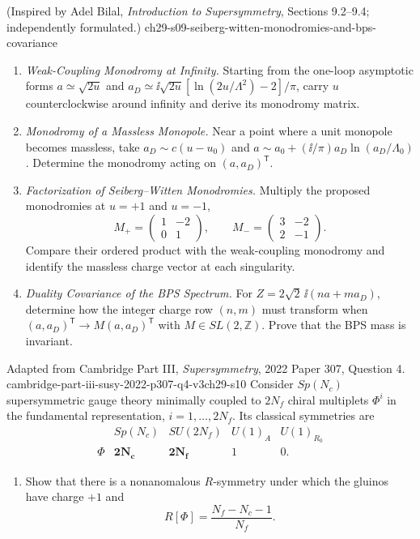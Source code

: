 \begin{enumerate}
    {(Inspired by Adel Bilal, \emph{Introduction to Supersymmetry}, Sections 9.2--9.4; independently formulated.)}
    {ch29-s09-seiberg-witten-monodromies-and-bps-covariance}
  \begin{enumerate}
    \item \emph{Weak-Coupling Monodromy at Infinity.}
    Starting from the one-loop asymptotic forms
      \(a\simeq\sqrt{2u}\) and
      \(a_D\simeq \ii\sqrt{2u}[\ln(2u/\Lambda^2)-2]/\pi\), carry \(u\)
      counterclockwise around infinity and derive its monodromy matrix.
    \item \emph{Monodromy of a Massless Monopole.}
    Near a point where a unit monopole becomes massless, take
      \(a_D\sim c(u-u_0)\) and
      \(a\sim a_0+(\ii/\pi)a_D\ln(a_D/\Lambda_0)\).
      Determine the monodromy acting on \((a,a_D)^{\mathsf T}\).
    \item \emph{Factorization of Seiberg--Witten Monodromies.}
    Multiply the proposed monodromies at \(u=+1\) and \(u=-1\),
      \[
        M_+=\begin{pmatrix}1&-2\\0&1\end{pmatrix},
        \qquad
        M_-=\begin{pmatrix}3&-2\\2&-1\end{pmatrix}.
      \]
      Compare their ordered product with the weak-coupling monodromy and
      identify the massless charge vector at each singularity.
    \item \emph{Duality Covariance of the BPS Spectrum.}
    For \(Z=2\sqrt2\,\ii(na+ma_D)\), determine how the integer charge row
      \((n,m)\) must transform when
      \((a,a_D)^{\mathsf T}\to M(a,a_D)^{\mathsf T}\) with
      \(M\in SL(2,\mathbb Z)\).  Prove that the BPS mass is invariant.
  \end{enumerate}

    {Adapted from Cambridge Part III, \emph{Supersymmetry}, 2022
    Paper 307, Question 4.}
    {cambridge-part-iii-susy-2022-p307-q4-v3ch29-s10}
  Consider \(Sp(N_c)\) supersymmetric gauge theory minimally coupled to
  \(2N_f\) chiral multiplets \(\Phi^i\) in the fundamental
  representation, \(i=1,\ldots,2N_f\).  Its classical symmetries are
  \[
  \begin{array}{c|cccc}
       &Sp(N_c)&SU(2N_f)&U(1)_A&U(1)_{R_0}\\ \hline
    \Phi&\boldsymbol{2N_c}&\boldsymbol{2N_f}&1&0 .
  \end{array}
  \tag{29.10.1}
  \]
  \begin{enumerate}
    \item[(i)]
    Show that there is a nonanomalous \(R\)-symmetry under which the gluinos
    have charge \(+1\) and
    \[
      R[\Phi]=\frac{N_f-N_c-1}{N_f}.
      \tag{29.10.2}
    \]


\end{enumerate}
\end{enumerate}
